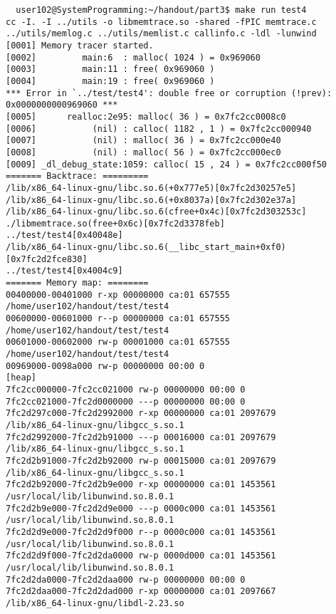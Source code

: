 \documentclass{report}
\begin{document}
\begin{verbatim}
  user102@SystemProgramming:~/handout/part3$ make run test4
cc -I. -I ../utils -o libmemtrace.so -shared -fPIC memtrace.c ../utils/memlog.c ../utils/memlist.c callinfo.c -ldl -lunwind
[0001] Memory tracer started.
[0002]         main:6  : malloc( 1024 ) = 0x969060
[0003]         main:11 : free( 0x969060 )
[0004]         main:19 : free( 0x969060 )
*** Error in `../test/test4': double free or corruption (!prev): 0x0000000000969060 ***
[0005]      realloc:2e95: malloc( 36 ) = 0x7fc2cc0008c0
[0006]           (nil) : calloc( 1182 , 1 ) = 0x7fc2cc000940
[0007]           (nil) : malloc( 36 ) = 0x7fc2cc000e40
[0008]           (nil) : malloc( 56 ) = 0x7fc2cc000ec0
[0009] _dl_debug_state:1059: calloc( 15 , 24 ) = 0x7fc2cc000f50
======= Backtrace: =========
/lib/x86_64-linux-gnu/libc.so.6(+0x777e5)[0x7fc2d30257e5]
/lib/x86_64-linux-gnu/libc.so.6(+0x8037a)[0x7fc2d302e37a]
/lib/x86_64-linux-gnu/libc.so.6(cfree+0x4c)[0x7fc2d303253c]
./libmemtrace.so(free+0x6c)[0x7fc2d3378feb]
../test/test4[0x40048e]
/lib/x86_64-linux-gnu/libc.so.6(__libc_start_main+0xf0)[0x7fc2d2fce830]
../test/test4[0x4004c9]
======= Memory map: ========
00400000-00401000 r-xp 00000000 ca:01 657555                             /home/user102/handout/test/test4
00600000-00601000 r--p 00000000 ca:01 657555                             /home/user102/handout/test/test4
00601000-00602000 rw-p 00001000 ca:01 657555                             /home/user102/handout/test/test4
00969000-0098a000 rw-p 00000000 00:00 0                                  [heap]
7fc2cc000000-7fc2cc021000 rw-p 00000000 00:00 0
7fc2cc021000-7fc2d0000000 ---p 00000000 00:00 0
7fc2d297c000-7fc2d2992000 r-xp 00000000 ca:01 2097679                    /lib/x86_64-linux-gnu/libgcc_s.so.1
7fc2d2992000-7fc2d2b91000 ---p 00016000 ca:01 2097679                    /lib/x86_64-linux-gnu/libgcc_s.so.1
7fc2d2b91000-7fc2d2b92000 rw-p 00015000 ca:01 2097679                    /lib/x86_64-linux-gnu/libgcc_s.so.1
7fc2d2b92000-7fc2d2b9e000 r-xp 00000000 ca:01 1453561                    /usr/local/lib/libunwind.so.8.0.1
7fc2d2b9e000-7fc2d2d9e000 ---p 0000c000 ca:01 1453561                    /usr/local/lib/libunwind.so.8.0.1
7fc2d2d9e000-7fc2d2d9f000 r--p 0000c000 ca:01 1453561                    /usr/local/lib/libunwind.so.8.0.1
7fc2d2d9f000-7fc2d2da0000 rw-p 0000d000 ca:01 1453561                    /usr/local/lib/libunwind.so.8.0.1
7fc2d2da0000-7fc2d2daa000 rw-p 00000000 00:00 0
7fc2d2daa000-7fc2d2dad000 r-xp 00000000 ca:01 2097667                    /lib/x86_64-linux-gnu/libdl-2.23.so

\end{verbatim}
\end{document}
